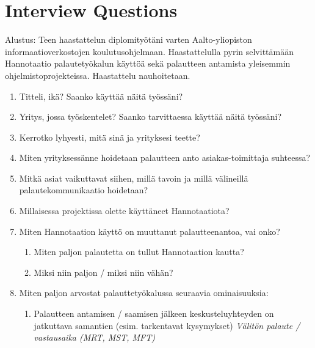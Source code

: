 \documentclass[english,12pt,a4paper,pdftex]{article}
\begin{document}




\appendix 

\clearpage

\section{Interview Questions\label{appendix:interview_questions}}

Alustus: Teen haastattelun diplomityötäni varten Aalto-yliopiston informaatioverkostojen koulutusohjelmaan. Haastattelulla pyrin selvittämään Hannotaatio palautetyökalun käyttöä sekä palautteen antamista yleisemmin ohjelmistoprojekteissa. Haastattelu nauhoitetaan. 

\begin{enumerate}

\item Titteli, ikä? Saanko käyttää näitä työssäni?

\item Yritys, jossa työskentelet? Saanko tarvittaessa käyttää näitä työssäni?

\item Kerrotko lyhyesti, mitä sinä ja yrityksesi teette?

\item Miten yrityksessänne hoidetaan palautteen anto asiakas-toimittaja suhteessa?

\item Mitkä asiat vaikuttavat siihen, millä tavoin ja millä välineillä palautekommunikaatio hoidetaan?

\item Millaisessa projektissa olette käyttäneet Hannotaatiota?

\item Miten Hannotaation käyttö on muuttanut palautteenantoa, vai onko?
  \begin{enumerate}
    \item Miten paljon palautetta on tullut Hannotaation kautta?
    \item Miksi niin paljon / miksi niin vähän?
  \end{enumerate}


\item Miten paljon arvostat palauttetyökalussa seuraavia ominaisuuksia:
  \begin{enumerate}
    \item Palautteen antamisen / saamisen jälkeen keskusteluyhteyden on jatkuttava samantien (esim. tarkentavat kysymykset) \textit{Välitön palaute / vastausaika (MRT, MST, MFT)}
    

\end{enumerate}
\end{enumerate}
\end{document}
